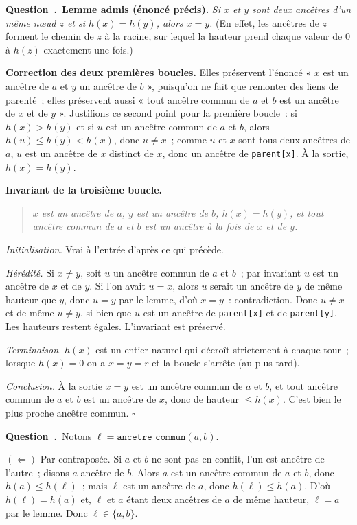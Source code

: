 \documentclass[11pt,a4paper]{article}
\renewcommand{\Q}{\medskip\par\stepcounter{qcnt}\noindent\textbf{\color{cnc}Question~\theqcnt.}~}
\begin{document}
\Q \textbf{Lemme admis (énoncé précis).} \emph{Si $x$ et $y$ sont deux ancêtres d'un même
n\oe ud $z$ et si $h(x)=h(y)$, alors $x=y$.} (En effet, les ancêtres de $z$ forment le
chemin de $z$ à la racine, sur lequel la hauteur prend chaque valeur de $0$ à $h(z)$
exactement une fois.)

\textbf{Correction des deux premières boucles.} Elles préservent l'énoncé « $x$ est un
ancêtre de $a$ et $y$ un ancêtre de $b$ », puisqu'on ne fait que remonter des liens de
parenté~; elles préservent aussi « tout ancêtre commun de $a$ et $b$ est un ancêtre de $x$
et de $y$ ». Justifions ce second point pour la première boucle~: si $h(x)>h(y)$ et si $u$
est un ancêtre commun de $a$ et $b$, alors $h(u)\le h(y)<h(x)$, donc $u\ne x$~; comme $u$ et
$x$ sont tous deux ancêtres de $a$, $u$ est un ancêtre de $x$ distinct de $x$, donc un
ancêtre de \texttt{parent[x]}. À la sortie, $h(x)=h(y)$.

\textbf{Invariant de la troisième boucle.}
\begin{quote}\itshape
$x$ est un ancêtre de $a$, $y$ est un ancêtre de $b$, $h(x)=h(y)$, et tout ancêtre commun de
$a$ et $b$ est un ancêtre à la fois de $x$ et de $y$.
\end{quote}
\emph{Initialisation.} Vrai à l'entrée d'après ce qui précède.

\emph{Hérédité.} Si $x\ne y$, soit $u$ un ancêtre commun de $a$ et $b$~; par invariant $u$
est un ancêtre de $x$ et de $y$. Si l'on avait $u=x$, alors $u$ serait un ancêtre de $y$ de
même hauteur que $y$, donc $u=y$ par le lemme, d'où $x=y$~: contradiction. Donc $u\ne x$ et
de même $u\ne y$, si bien que $u$ est un ancêtre de \texttt{parent[x]} et de
\texttt{parent[y]}. Les hauteurs restent égales. L'invariant est préservé.

\emph{Terminaison.} $h(x)$ est un entier naturel qui décroît strictement à chaque tour~;
lorsque $h(x)=0$ on a $x=y=r$ et la boucle s'arrête (au plus tard).

\emph{Conclusion.} À la sortie $x=y$ est un ancêtre commun de $a$ et $b$, et tout ancêtre
commun de $a$ et $b$ est un ancêtre de $x$, donc de hauteur $\le h(x)$. C'est bien le plus
proche ancêtre commun. \hfill$\square$

\Q Notons $\ell=\texttt{ancetre\_commun}(a,b)$.

$(\Leftarrow)$ Par contraposée. Si $a$ et $b$ ne sont pas en conflit, l'un est ancêtre de
l'autre~; disons $a$ ancêtre de $b$. Alors $a$ est un ancêtre commun de $a$ et $b$, donc
$h(a)\le h(\ell)$~; mais $\ell$ est un ancêtre de $a$, donc $h(\ell)\le h(a)$. D'où
$h(\ell)=h(a)$ et, $\ell$ et $a$ étant deux ancêtres de $a$ de même hauteur, $\ell=a$ par le
lemme. Donc $\ell\in\{a,b\}$.
\end{document}
